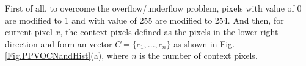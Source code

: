 \documentclass[review,3p,10pt,sort&compress]{elsarticle}
\begin{document}
First of all, to overcome the overflow/underflow problem, pixels with value of 0 are modified to 1 and with value of 255 are modified to 254. And then, for current pixel $x$, the context pixels defined as the pixels in the lower right direction and form an vector $C=\{c_1,...,c_n\}$ as shown in Fig. \ref{Fig.PPVOCNandHist}(a), where $n$ is the number of context pixels.
\begin{figure}
\centering
{}
\qquad\qquad
{}
\end{figure}
\end{document}
